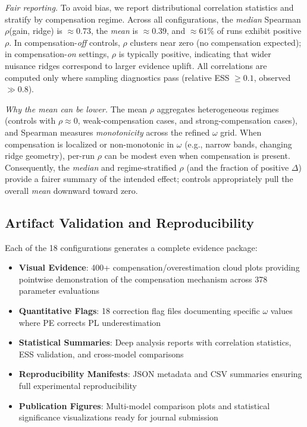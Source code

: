 \documentclass[conference]{IEEEtran}
\begin{document}
\noindent\textit{Fair reporting.} To avoid bias, we report distributional correlation statistics and stratify by compensation regime. Across all configurations, the \emph{median} Spearman $\rho$(gain, ridge) is $\approx 0.73$, the \emph{mean} is $\approx 0.39$, and $\approx 61\%$ of runs exhibit positive $\rho$. In compensation-\emph{off} controls, $\rho$ clusters near zero (no compensation expected); in compensation-\emph{on} settings, $\rho$ is typically positive, indicating that wider nuisance ridges correspond to larger evidence uplift. All correlations are computed only where sampling diagnostics pass (relative ESS $\ge 0.1$, observed $\gg 0.8$).

\noindent\textit{Why the mean can be lower.} The mean $\rho$ aggregates heterogeneous regimes (controls with $\rho\!\approx\!0$, weak-compensation cases, and strong-compensation cases), and Spearman measures \emph{monotonicity} across the refined $\omega$ grid. When compensation is localized or non-monotonic in $\omega$ (e.g., narrow bands, changing ridge geometry), per-run $\rho$ can be modest even when compensation is present. Consequently, the \emph{median} and regime-stratified $\rho$ (and the fraction of positive $\Delta$) provide a fairer summary of the intended effect; controls appropriately pull the overall \emph{mean} downward toward zero.

\subsection{Artifact Validation and Reproducibility}
Each of the 18 configurations generates a complete evidence package:
\begin{itemize}
\item \textbf{Visual Evidence}: 400+ compensation/overestimation cloud plots providing pointwise demonstration of the compensation mechanism across 378 parameter evaluations
\item \textbf{Quantitative Flags}: 18 correction flag files documenting specific $\omega$ values where PE corrects PL underestimation
\item \textbf{Statistical Summaries}: Deep analysis reports with correlation statistics, ESS validation, and cross-model comparisons
\item \textbf{Reproducibility Manifests}: JSON metadata and CSV summaries ensuring full experimental reproducibility
\item \textbf{Publication Figures}: Multi-model comparison plots and statistical significance visualizations ready for journal submission
\end{itemize}
\end{document}
